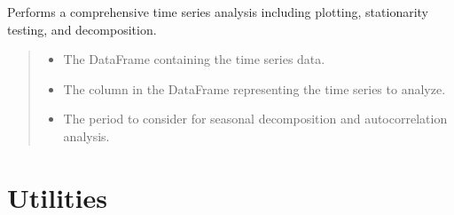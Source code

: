 \documentclass[letterpaper,10pt,english]{sphinxmanual}
\begin{document}
\begin{fulllineitems}
\label{\detokenize{docs/time_series_analysis:time_series_analysis.time_s_analysis}}
\pysigstartsignatures
{}
\pysigstopsignatures
\sphinxAtStartPar
Performs a comprehensive time series analysis including plotting, stationarity testing, and decomposition.
\begin{quote}\begin{description}
\begin{itemize}
\item {} 
\sphinxAtStartPar
{} \textendash{} The DataFrame containing the time series data.

\item {} 
\sphinxAtStartPar
{} \textendash{} The column in the DataFrame representing the time series to analyze.

\item {} 
\sphinxAtStartPar
{} \textendash{} The period to consider for seasonal decomposition and autocorrelation analysis.

\end{itemize}

\end{description}\end{quote}

\end{fulllineitems}


\sphinxstepscope


\section{Utilities}
\label{\detokenize{docs/utilities:module-utilities}}\label{\detokenize{docs/utilities:utilities}}\label{\detokenize{docs/utilities::doc}}
\end{document}
